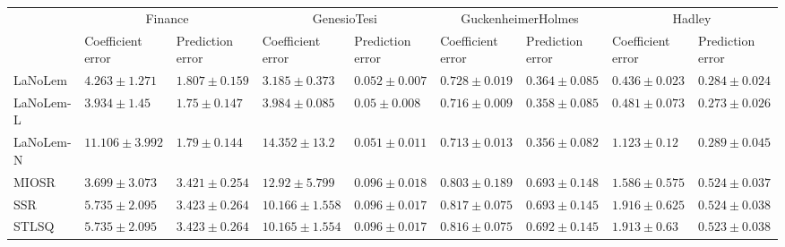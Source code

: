 \begin{table*}
{\begin{tabular}{lllllllll}
 & \multicolumn{2}{c}{Finance} & \multicolumn{2}{c}{GenesioTesi} & \multicolumn{2}{c}{GuckenheimerHolmes} & \multicolumn{2}{c}{Hadley} \\
 & Coefficient error & Prediction error & Coefficient error & Prediction error & Coefficient error & Prediction error & Coefficient error & Prediction error \\
\midrule
LaNoLem & $4.263\pm 1.271$ & $1.807\pm 0.159$ & $\mathbf{3.185}\pm 0.373$ & $0.052\pm 0.007$ & $0.728\pm 0.019$ & $0.364\pm 0.085$ & $\mathbf{0.436}\pm 0.023$ & $0.284\pm 0.024$ \\
LaNoLem-L & $3.934\pm 1.45$ & $\mathbf{1.75}\pm 0.147$ & $3.984\pm 0.085$ & $\mathbf{0.05}\pm 0.008$ & $0.716\pm 0.009$ & $0.358\pm 0.085$ & $0.481\pm 0.073$ & $\mathbf{0.273}\pm 0.026$ \\
LaNoLem-N & $11.106\pm 3.992$ & $1.79\pm 0.144$ & $14.352\pm 13.2$ & $0.051\pm 0.011$ & $\mathbf{0.713}\pm 0.013$ & $\mathbf{0.356}\pm 0.082$ & $1.123\pm 0.12$ & $0.289\pm 0.045$ \\
MIOSR & $\mathbf{3.699}\pm 3.073$ & $3.421\pm 0.254$ & $12.92\pm 5.799$ & $0.096\pm 0.018$ & $0.803\pm 0.189$ & $0.693\pm 0.148$ & $1.586\pm 0.575$ & $0.524\pm 0.037$ \\
SSR & $5.735\pm 2.095$ & $3.423\pm 0.264$ & $10.166\pm 1.558$ & $0.096\pm 0.017$ & $0.817\pm 0.075$ & $0.693\pm 0.145$ & $1.916\pm 0.625$ & $0.524\pm 0.038$ \\
STLSQ & $5.735\pm 2.095$ & $3.423\pm 0.264$ & $10.165\pm 1.554$ & $0.096\pm 0.017$ & $0.816\pm 0.075$ & $0.692\pm 0.145$ & $1.913\pm 0.63$ & $0.523\pm 0.038$ \\

\midrule


\end{tabular}}
\end{table*}
